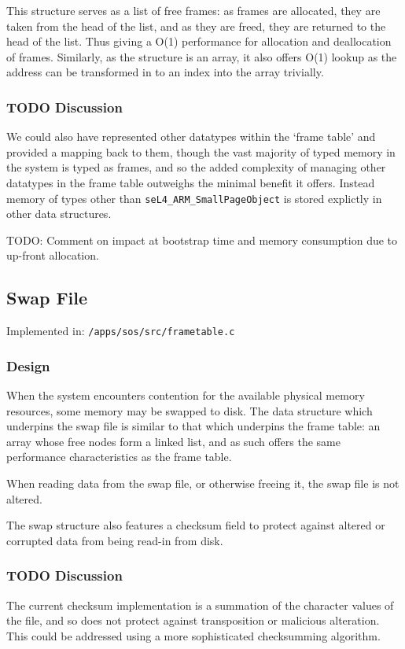 \documentclass[a4paper,12pt]{article}
\begin{document}
This structure serves as a list of free frames: as frames are allocated, they
are taken from the head of the list, and as they are freed, they are returned
to the head of the list.  Thus giving a O(1) performance for allocation and
deallocation of frames.  Similarly, as the structure is an array, it also
offers O(1) lookup as the address can be transformed in to an index into the
array trivially.

\subsubsection{TODO Discussion}
We could also have represented other datatypes within the `frame table' and
provided a mapping back to them, though the vast majority of typed memory in
the system is typed as frames, and so the added complexity of managing other
datatypes in the frame table outweighs the minimal benefit it offers.  Instead
memory of types other than \texttt{seL4\_ARM\_SmallPageObject} is stored
explictly in other data structures.

TODO: Comment on impact at bootstrap time and memory consumption due to
up-front allocation.

\subsection{Swap File}
Implemented in: \texttt{/apps/sos/src/frametable.c}

\subsubsection{Design}
When the system encounters contention for the available physical memory
resources, some memory may be swapped to disk.  The data structure which
underpins the swap file is similar to that which underpins the frame table: an
array whose free nodes form a linked list, and as such offers the same
performance characteristics as the frame table.

When reading data from the swap file, or otherwise freeing it, the swap file
is not altered.

The swap structure also features a checksum field to protect against altered
or corrupted data from being read-in from disk.

\subsubsection{TODO Discussion}
The current checksum implementation is a summation of the character values of
the file, and so does not protect against transposition or malicious
alteration.  This could be addressed using a more sophisticated checksumming
algorithm.
\end{document}
